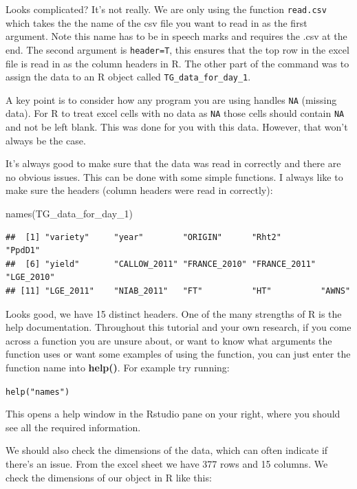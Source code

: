 \documentclass[
]{book}
\newenvironment{Shaded}{\begin{snugshade}}{\end{snugshade}}
\newcommand{\FunctionTok}[1]{\textcolor[rgb]{0.00,0.00,0.00}{#1}}
\newcommand{\NormalTok}[1]{#1}
\begin{document}
Looks complicated? It's not really. We are only using the function \texttt{read.csv} which takes the the name of the csv file you want to read in as the first argument. Note this name has to be in speech marks and requires the .csv at the end. The second argument is \texttt{header=T}, this ensures that the top row in the excel file is read in as the column headers in R. The other part of the command was to assign the data to an R object called \texttt{TG\_data\_for\_day\_1}.

A key point is to consider how any program you are using handles \texttt{NA} (missing data). For R to treat excel cells with no data as \texttt{NA} those cells should contain \texttt{NA} and not be left blank. This was done for you with this data. However, that won't always be the case.

It's always good to make sure that the data was read in correctly and there are no obvious issues. This can be done with some simple functions. I always like to make sure the headers (column headers were read in correctly):

\begin{Shaded}
\begin{Highlighting}[]
\FunctionTok{names}\NormalTok{(TG\_data\_for\_day\_1)}
\end{Highlighting}
\end{Shaded}

\begin{verbatim}
##  [1] "variety"     "year"        "ORIGIN"      "Rht2"        "PpdD1"      
##  [6] "yield"       "CALLOW_2011" "FRANCE_2010" "FRANCE_2011" "LGE_2010"   
## [11] "LGE_2011"    "NIAB_2011"   "FT"          "HT"          "AWNS"
\end{verbatim}

Looks good, we have 15 distinct headers. One of the many strengths of R is the help documentation. Throughout this tutorial and your own research, if you come across a function you are unsure about, or want to know what arguments the function uses or want some examples of using the function, you can just enter the function name into \textbf{help()}. For example try running:

\texttt{help("names")}

This opens a help window in the Rstudio pane on your right, where you should see all the required information.

We should also check the dimensions of the data, which can often indicate if there's an issue. From the excel sheet we have 377 rows and 15 columns. We check the dimensions of our object in R like this:
\end{document}
